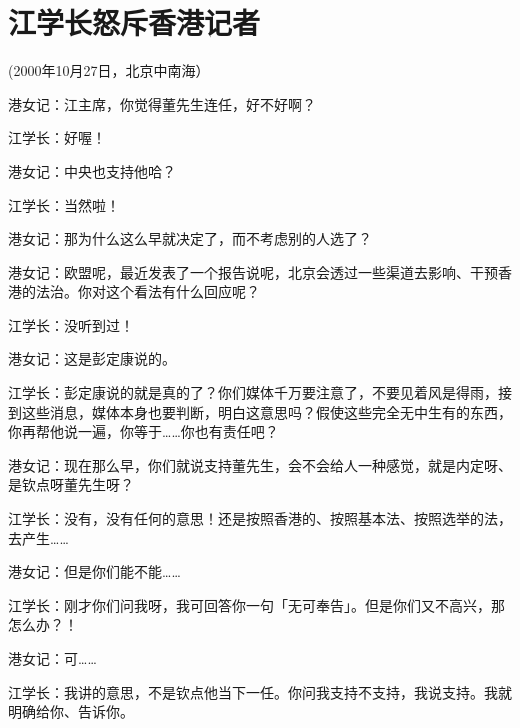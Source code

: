 %
%
%
%
%
%
%
%
\chapter{江学长怒斥香港记者}

(2000年10月27日，北京中南海）

港女记：江主席，你觉得董先生连任，好不好啊？

江学长：好喔！

港女记：中央也支持他哈？

江学长：当然啦！

港女记：那为什么这么早就决定了，而不考虑别的人选了？

港女记：欧盟呢，最近发表了一个报告说呢，北京会透过一些渠道去影响、干预香港的法治。你对这个看法有什么回应呢？

江学长：没听到过！

港女记：这是彭定康说的。

江学长：彭定康说的就是真的了？你们媒体千万要注意了，不要见着风是得雨，接到这些消息，媒体本身也要判断，明白这意思吗？假使这些完全无中生有的东西，你再帮他说一遍，你等于……你也有责任吧？

港女记：现在那么早，你们就说支持董先生，会不会给人一种感觉，就是内定呀、是钦点呀董先生呀？

江学长：没有，没有任何的意思！还是按照香港的、按照基本法、按照选举的法，去产生……

港女记：但是你们能不能……

江学长：刚才你们问我呀，我可回答你一句「无可奉告」。但是你们又不高兴，那怎么办？！

港女记：可……

江学长：我讲的意思，不是钦点他当下一任。你问我支持不支持，我说支持。我就明确给你、告诉你。

